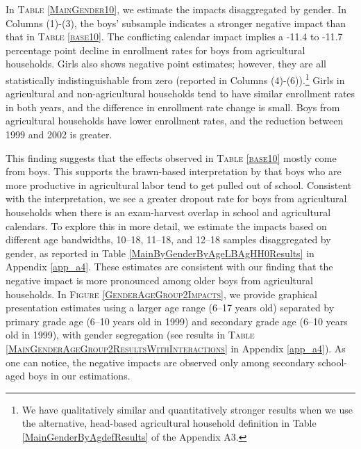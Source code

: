 \documentclass[12pt,letterpaper]{article}
\newcommand{\0}{\ensuremath{\mbox{\boldmath $0$}}}
\begin{document}
In \textsc{\small Table \ref{MainGender10}}, we estimate the impacts disaggregated by gender. In Columns (1)-(3), the boys' subsample indicates a stronger negative impact than that in \textsc{\small Table \ref{base10}}. The conflicting calendar impact implies a -11.4 to -11.7 percentage point decline in enrollment rates for boys from agricultural households. Girls also shows negative point estimates; however, they are all statistically indistinguishable from zero (reported in Columns (4)-(6)).\footnote{We have qualitatively similar and quantitatively stronger results when we use the alternative, head-based agricultural household definition in \textsf{\small Table \ref{MainGenderByAgdefResults}} of the Appendix A3.} Girls in agricultural and non-agricultural households tend to have similar enrollment rates in both years, and the difference in enrollment rate change is small. Boys from agricultural households have lower enrollment rates, and the reduction between 1999 and 2002 is greater. 

This finding suggests that the effects observed in \textsc{\small Table \ref{base10}} mostly come from boys. This supports the brawn-based interpretation by \cite{PittRosenzweigHassan2010} that boys who are more productive in agricultural labor tend to get pulled out of school. Consistent with the interpretation, we see a greater dropout rate for boys from agricultural households when there is an exam-harvest overlap in school and agricultural calendars. To explore this in more detail, we estimate the impacts based on different age bandwidths, 10–18, 11–18, and 12–18 samples disaggregated by gender, as reported in Table \ref{MainByGenderByAgeLBAgHH0Results} in Appendix \ref{app_a4}. These estimates are consistent with our finding that the negative impact is more pronounced among older boys from agricultural households. In \textsc{\small Figure \ref{GenderAgeGroup2Impacts}}, we provide graphical presentation estimates using a larger age range (6–17 years old) separated by primary grade age (6–10 years old in 1999) and secondary grade age (6–10 years old in 1999), with gender segregation (see results in \textsc{\small Table \ref{MainGenderAgeGroup2ResultsWithInteractions}} in Appendix \ref{app_a4}). As one can notice, the negative impacts are observed only among secondary school-aged boys in our estimations. 

\end{document}
